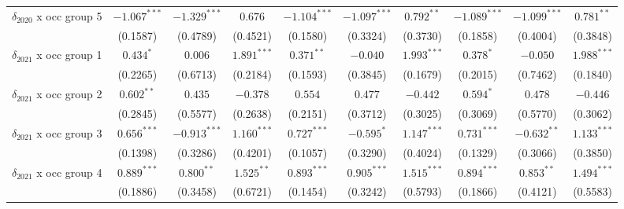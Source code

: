 \begin{tabular}{l|ccc|ccc|ccc|}
$\delta_{2020}$ x occ group 5          &          $-1.067^{***}$ &  $-1.329^{***}$ &         $0.676$ &           $-1.104^{***}$ &  $-1.097^{***}$ &    $0.792^{**}$ &           $-1.089^{***}$ &  $-1.099^{***}$ &    $0.781^{**}$ \\
                                       &                (0.1587) &        (0.4789) &        (0.4521) &                 (0.1580) &        (0.3324) &        (0.3730) &                 (0.1858) &        (0.4004) &        (0.3848) \\
$\delta_{2021}$ x occ group 1          &               $0.434^*$ &         $0.006$ &   $1.891^{***}$ &             $0.371^{**}$ &        $-0.040$ &   $1.993^{***}$ &                $0.378^*$ &        $-0.050$ &   $1.988^{***}$ \\
                                       &                (0.2265) &        (0.6713) &        (0.2184) &                 (0.1593) &        (0.3845) &        (0.1679) &                 (0.2015) &        (0.7462) &        (0.1840) \\
$\delta_{2021}$ x occ group 2          &            $0.602^{**}$ &         $0.435$ &        $-0.378$ &                  $0.554$ &         $0.477$ &        $-0.442$ &                $0.594^*$ &         $0.478$ &        $-0.446$ \\
                                       &                (0.2845) &        (0.5577) &        (0.2638) &                 (0.2151) &        (0.3712) &        (0.3025) &                 (0.3069) &        (0.5770) &        (0.3062) \\
$\delta_{2021}$ x occ group 3          &           $0.656^{***}$ &  $-0.913^{***}$ &   $1.160^{***}$ &            $0.727^{***}$ &      $-0.595^*$ &   $1.147^{***}$ &            $0.731^{***}$ &   $-0.632^{**}$ &   $1.133^{***}$ \\
                                       &                (0.1398) &        (0.3286) &        (0.4201) &                 (0.1057) &        (0.3290) &        (0.4024) &                 (0.1329) &        (0.3066) &        (0.3850) \\
$\delta_{2021}$ x occ group 4          &           $0.889^{***}$ &    $0.800^{**}$ &    $1.525^{**}$ &            $0.893^{***}$ &   $0.905^{***}$ &   $1.515^{***}$ &            $0.894^{***}$ &    $0.853^{**}$ &   $1.494^{***}$ \\
                                       &                (0.1886) &        (0.3458) &        (0.6721) &                 (0.1454) &        (0.3242) &        (0.5793) &                 (0.1866) &        (0.4121) &        (0.5583) \\

\end{tabular}

